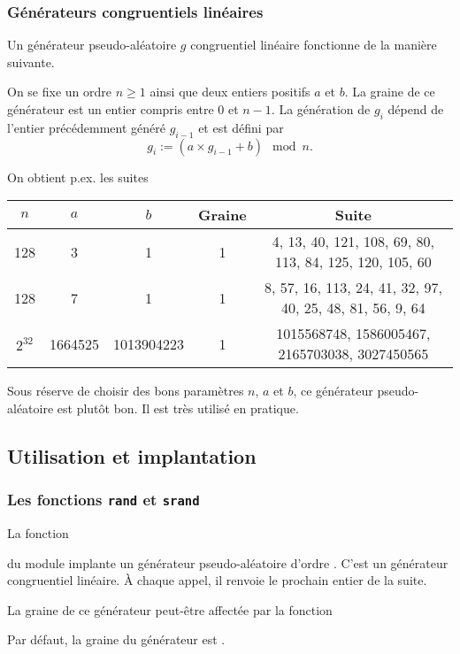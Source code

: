 \begin{frame}[fragile]\frametitle{Générateurs congruentiels linéaires}
Un générateur pseudo-aléatoire $g$ \alert{congruentiel linéaire} fonctionne
de la manière suivante.
\medskip

On se fixe un ordre $n \geq 1$ ainsi que deux entiers positifs $a$ et $b$.
La graine de ce générateur est un entier compris entre $0$ et $n - 1$.
La génération de $g_i$ dépend de l'entier précédemment généré $g_{i - 1}$
et est défini par
\begin{equation*}
    g_i := (a \times g_{i - 1} + b) \mod n.
\end{equation*}

On obtient p.ex. les suites
\begin{center} \scriptsize
    \begin{tabular}{c|c|c|c|c}
        $n$ & $a$ & $b$ & Graine & Suite \\ \hline
        128 & 3 & 1 & 1 & 4, 13, 40, 121, 108, 69, 80, 113, 84, 125,
            120, 105, 60 \\
        128 & 7 & 1 & 1 & 8, 57, 16, 113, 24, 41, 32, 97, 40, 25,
        48, 81, 56, 9, 64 \\
        $2^{32}$ & 1664525 & 1013904223 & 1 &
            1015568748, 1586005467, 2165703038, 3027450565 \\
    \end{tabular}
\end{center}
\medskip

Sous réserve de choisir des bons paramètres $n$, $a$ et $b$, ce
générateur pseudo-aléatoire est plutôt bon. Il est très utilisé en
pratique.
\end{frame}

\subsection{Utilisation et implantation}

\begin{frame}[fragile]\frametitle{Les fonctions {\tt rand} et {\tt srand}}
La fonction
\begin{center}  \end{center}
du module  implante un générateur pseudo-aléatoire d'ordre
. C'est un générateur congruentiel linéaire. À chaque
appel, il renvoie le prochain entier de la suite.
\bigskip
\bigskip

La graine de ce générateur peut-être affectée par la fonction
\begin{center}  \end{center}
Par défaut, la graine du générateur est .
\end{frame}

